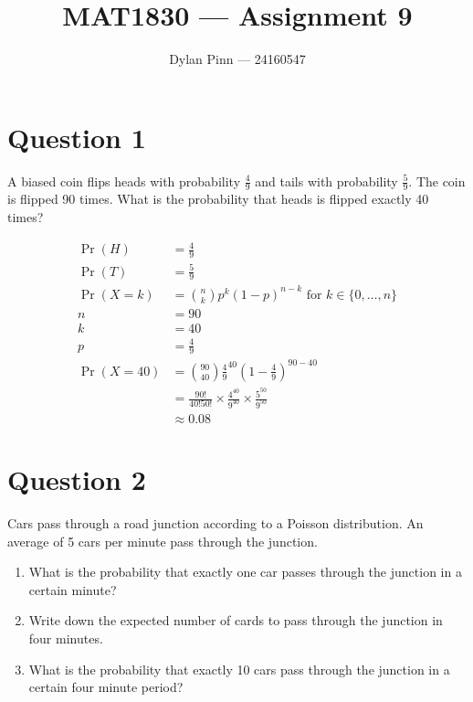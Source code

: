 \documentclass[11pt]{article}
\begin{document}
\title{MAT1830 --- Assignment 9}
\author{Dylan Pinn --- 24160547}
\maketitle

\section*{Question 1}

A biased coin flips heads with probability $\frac{4}{9}$ and tails with
probability $\frac{5}{9}$. The coin is flipped 90 times. What is the probability
that heads is flipped exactly 40 times?

\begin{align*}
  \Pr(H) &= \frac{4}{9} \\
  \Pr(T) &= \frac{5}{9} \\
  \Pr(X = k) &= \binom{n}{k} p^k {(1-p)}^{n-k} \text{ for } k \in \{ 0,
    \dots, n \} \\
  n &= 90 \\
  k &= 40 \\
  p &= \frac{4}{9} \\
  \Pr(X = 40) &= \binom{90}{40} {\frac{4}{9}}^{40} {(1-\frac{4}{9})}^{90-40} \\
  &= \frac{90!}{40!50!} \times \frac{4^{40}}{9^{40}} \times
  \frac{5^{50}}{9^{50}} \\
  &\approx 0.08
\end{align*}

\break{}

\section*{Question 2}

Cars pass through a road junction according to a Poisson distribution. An
average of 5 cars per minute pass through the junction.

\begin{enumerate}[label= (\alph*)]
  \item What is the probability that exactly one car passes through the
    junction in a certain minute?

  \item Write down the expected number of cards to pass through the junction in
    four minutes.

  \item What is the probability that exactly 10 cars pass through the junction
    in a certain four minute period?

\end{enumerate}
\end{document}
